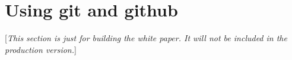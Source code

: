 
\section{Using git and github}  \label{sec:git}

[\emph{This section is just for building the white paper.  It will not be included in the
  production version.}]